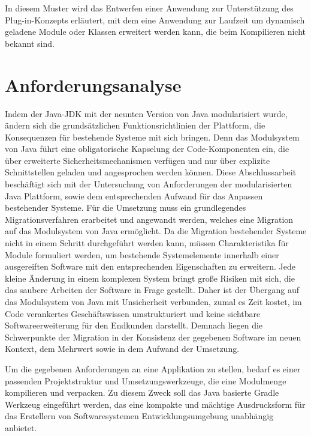 In diesem Muster wird das Entwerfen einer Anwendung zur Unterstützung des Plug-in-Konzepts erläutert, mit dem eine Anwendung zur Laufzeit um dynamisch geladene Module oder Klassen erweitert werden kann, die beim Kompilieren nicht bekannt sind.

\section{Anforderungsanalyse} 
	Indem der Java-JDK mit der neunten Version von Java modularisiert wurde, ändern sich die grundsätzlichen Funktionsrichtlinien der Plattform, die Konsequenzen für bestehende Systeme mit sich bringen. Denn das Modulsystem von Java führt eine obligatorische Kapselung der Code-Komponenten ein, die über erweiterte Sicherheitsmechanismen verfügen und nur über explizite Schnittstellen geladen und angesprochen werden können.\newline 
	Diese Abschlussarbeit beschäftigt sich mit der Untersuchung von Anforderungen der modularisierten Java Plattform, sowie dem entsprechenden Aufwand für das Anpassen bestehender Systeme. \newline
	Für die Umsetzung muss ein grundlegendes Migrationsverfahren erarbeitet und angewandt werden, welches eine Migration auf das Modulsystem von Java ermöglicht. Da die Migration bestehender Systeme nicht in einem Schritt durchgeführt werden kann, müssen Charakteristika für Module formuliert werden, um bestehende Systemelemente innerhalb einer ausgereiften Software mit den entsprechenden Eigenschaften zu erweitern.\newline
	Jede kleine Änderung in einem komplexen System bringt große Risiken mit sich, die das saubere Arbeiten der Software in Frage gestellt. Daher ist der Übergang auf das Modulsystem von Java mit Unsicherheit verbunden, zumal es Zeit kostet, im Code verankertes Geschäftswissen umstrukturiert und keine sichtbare Softwareerweiterung für den Endkunden darstellt. Demnach liegen die Schwerpunkte der Migration in der Konsistenz der gegebenen Software im neuen Kontext, dem Mehrwert sowie in dem Aufwand der Umsetzung. \bigbreak

	Um die gegebenen Anforderungen an eine Applikation zu stellen, bedarf es einer passenden Projektstruktur und Umsetzungswerkzeuge, die eine Modulmenge kompilieren und verpacken. Zu diesem Zweck soll das Java basierte Gradle Werkzeug eingeführt werden, das eine kompakte und mächtige Ausdrucksform für das Erstellern von Softwaresystemen Entwicklungsumgebung unabhängig anbietet. \bigbreak

